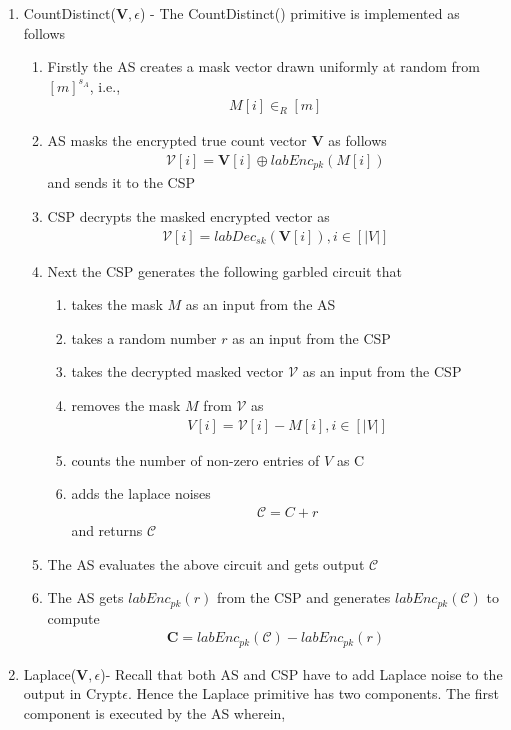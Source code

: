 \begin{enumerate}
\item \textsf{CountDistinct}($\mathbf{V},\epsilon$) - The \textsf{CountDistinct}() primitive is implemented as follows \begin{enumerate}\item Firstly the \textsf{AS} creates a mask vector drawn uniformly at random from $[m]^{s_A}$, i.e.,  \begin{gather} M[i] \in_R [m]\end{gather} \item \textsf{AS} masks the encrypted true count vector $\mathbf{V}$  as follows \begin{gather}\boldsymbol{\mathcal{V}}[i]= \mathbf{V}[i] \oplus labEnc_{pk}(M[i])\end{gather} and sends it to the \textsf{CSP} \item \textsf{CSP} decrypts the masked encrypted vector as \begin{gather*}\mathcal{V}[i]=labDec_{sk}(\mathbf{V}[i]), i \in [|V|]\end{gather*} \item Next the \textsf{CSP} generates the following garbled circuit that\begin{enumerate}  \item takes the mask $M$ as an input from the \textsf{AS} \item takes a random number $r$  as an input from the \textsf{CSP}\item takes the decrypted masked vector $\mathcal{V}$ as an input from the \textsf{CSP} \item removes the mask $M$ from $\mathcal{V}$ as \begin{gather*}V[i]=\mathcal{V}[i]-M[i], i \in [|V|]\end{gather*}\item  counts the number of non-zero entries of $V$ as C \item adds the laplace noises \begin{gather*}\mathcal{C}=C+r\end{gather*} and returns $\mathcal{C}$ \end{enumerate} \item The \textsf{AS} evaluates the above circuit and gets output $\mathcal{C}$ \item The \textsf{AS} gets $labEnc_{pk}(r)$ from the \textsf{CSP} and generates $labEnc_{pk}(\mathcal{C})$ to compute\begin{gather*}\mathbf{C}=labEnc_{pk}(\mathcal{C})-labEnc_{pk}(r)\end{gather*} \end{enumerate} \item \textsf{Laplace}($\mathbf{V},\epsilon$)- Recall that both \textsf{AS} and \textsf{CSP} have to add Laplace noise to the output in Crypt$\epsilon$. Hence the \textsf{Laplace} primitive has two components. The first component is executed by the \textsf{AS} wherein,

\end{enumerate}
